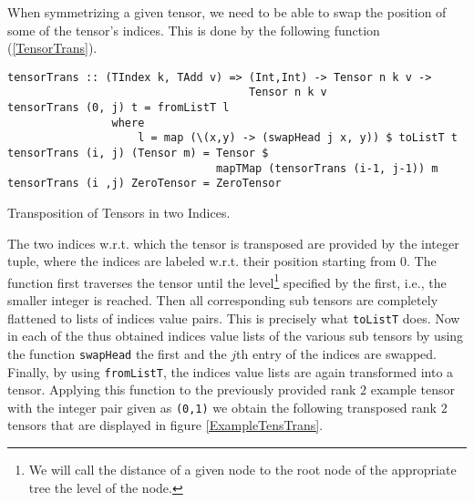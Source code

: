 When symmetrizing a given tensor, we need to be able to swap the position of some of the tensor's indices. This is done by the following function (\ref{TensorTrans}).
\begin{listing}[hbt!]
\begin{verbatim}
tensorTrans :: (TIndex k, TAdd v) => (Int,Int) -> Tensor n k v ->
                                     Tensor n k v
tensorTrans (0, j) t = fromListT l
                where
                    l = map (\(x,y) -> (swapHead j x, y)) $ toListT t
tensorTrans (i, j) (Tensor m) = Tensor $
                                mapTMap (tensorTrans (i-1, j-1)) m
tensorTrans (i ,j) ZeroTensor = ZeroTensor
\end{verbatim}
\caption{Transposition of Tensors in two Indices.}\label{TensorTrans}
\end{listing}
The two indices w.r.t. which the tensor is transposed are provided by the integer tuple, where the indices are labeled w.r.t. their position starting from 0. The function first traverses the tensor until the level\footnote{We will call the distance of a given node to the root node of the appropriate tree the level of the node.} specified by the first, i.e., the smaller integer is reached. Then all corresponding sub tensors are completely flattened to lists of indices value pairs. This is precisely what \texttt{toListT} does. Now in each of the thus obtained indices value lists of the various sub tensors by using the function \texttt{swapHead} the first and the $j$th entry of the indices are swapped. Finally, by using  \texttt{fromListT}, the indices value lists are again transformed into a tensor.  Applying this function to the previously provided rank $2$ example tensor with the integer pair given as \texttt{(0,1)} we obtain the following transposed rank $2$ tensors that are displayed in figure \ref{ExampleTensTrans}.

